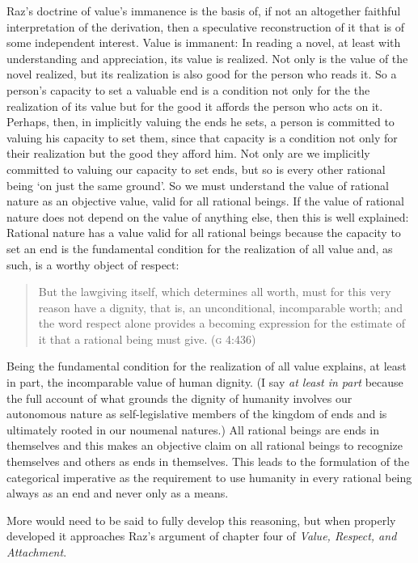 \documentclass[12pt]{article}
\begin{document}
Raz's doctrine of value's immanence is the basis of, if not an altogether faithful interpretation of the derivation, then a speculative reconstruction of it that is of some independent interest. Value is immanent: In reading a novel, at least with understanding and appreciation, its value is realized. Not only is the value of the novel realized, but its realization is also good for the person who reads it. So a person's capacity to set a valuable end is a condition not only for the the realization of its value but for the good it affords the person who acts on it. Perhaps, then, in implicitly valuing the ends he sets, a person is committed to valuing his capacity to set them, since that capacity is a condition not only for their realization but the good they afford him. Not only are we implicitly committed to valuing our capacity to set ends, but so is every other rational being `on just the same ground'. So we must understand the value of rational nature as an objective value, valid for all rational beings. If the value of rational nature does not depend on the value of anything else, then this is well explained: Rational nature has a value valid for all rational beings because the capacity to set an end is the fundamental condition for the realization of all value and, as such, is a worthy object of respect: 
\begin{quote}
	But the lawgiving itself, which determines all worth, must for this very reason have a dignity, that is, an unconditional, incomparable worth; and the word respect alone provides a becoming expression for the estimate of it that a rational being must give. (\textsc{g} 4:436) 
\end{quote}
Being the fundamental condition for the realization of all value explains, at least in part, the incomparable value of human dignity. (I say \emph{at least in part} because the full account of what grounds the dignity of humanity involves our autonomous nature as self-legislative members of the kingdom of ends and is ultimately rooted in our noumenal natures.) All rational beings are ends in themselves and this makes an objective claim on all rational beings to recognize themselves and others as ends in themselves. This leads to the formulation of the categorical imperative as the requirement to use humanity in every rational being always as an end and never only as a means.

More would need to be said to fully develop this reasoning, but when properly developed it approaches Raz's argument of chapter four of \emph{Value, Respect, and Attachment}. 
\end{document}
